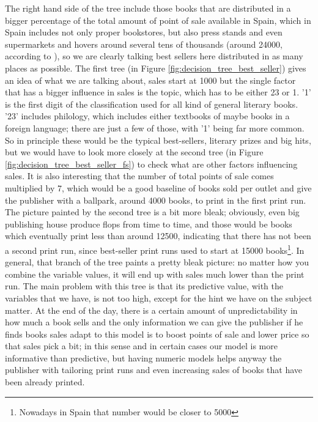 \documentclass[a4paper,10pt,twocolumn,preprint,3p]{elsarticle}
\begin{document}
The right hand side of the tree include those books that are
distributed in a bigger percentage of the total amount of point of
sale available in Spain, which in Spain includes not only proper
bookstores, but also press stands and even supermarkets and hovers
around several tens of thousands (around 24000, according to
\cite{POS}), so we are clearly talking best sellers here distributed in
as many places as possible. The first tree
(in Figure \ref{fig:decision_tree_best_seller}) gives an idea of what we
are talking about, sales start at 1000 but the single factor that has
a bigger influence in sales is the topic, which has to be either 23 or
1. '1' is the first digit of the classification used for all kind of
general literary books. '23' includes philology, which includes either
textbooks of maybe books in a foreign language; there are just a few
of those, with '1' being far more common. So in principle these would
be the typical best-sellers, literary prizes and big hits, but we
would have to look more closely at the second tree
(in Figure \ref{fig:decision_tree_best_seller_fs}) to check what are other factors
influencing sales. It is also interesting that the number of total
points of sale comes multiplied by 7, which would be a good baseline
of books sold per outlet and give the publisher with a ballpark,
around 4000 books, to print in the first print run. The picture
painted by the second tree is a bit more bleak; obviously, even big
publishing house produce flops from time to time, and those would be
books which eventually print less than around 12500, indicating that
there has not been a second print run, since best-seller print runs
used to start at 15000 books\footnote{Nowadays in Spain that number
  would be closer to 5000}. In general, that branch of the tree paints
a pretty bleak picture: no matter how you combine the variable values,
it will end up with sales much lower than the print run. The main
problem with this tree is that its predictive value, with the
variables that we have, is not too high, except for the hint we have
on the subject matter. At the end of the day, there is a certain
amount of unpredictability in how much a book sells and the only
information we can give the publisher if he finds books sales adapt to
this model is to boost points of sale and lower price so that sales
pick a bit; in this sense and in certain cases our model is more
informative than predictive, but having numeric models helps anyway
the publisher with tailoring print runs and even increasing sales of
books that have been already printed.
\end{document}
